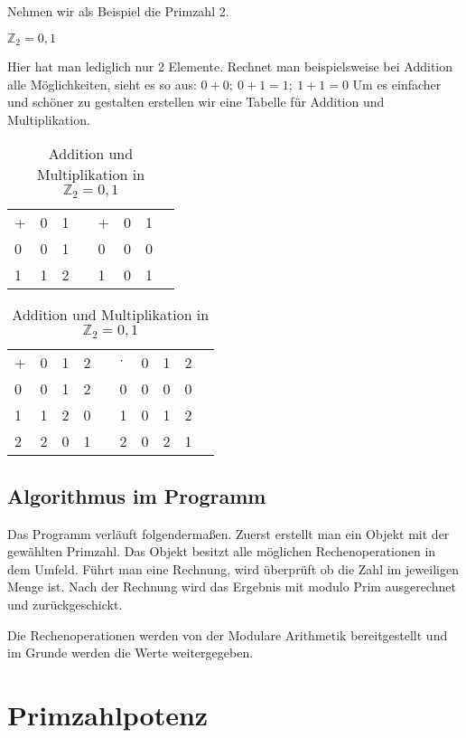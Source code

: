Nehmen wir als Beispiel die Primzahl 2.

$ \mathbb{Z}_2 = {0,1} $

Hier hat man lediglich nur 2 Elemente. Rechnet man beispielsweise bei Addition alle Möglichkeiten, sieht es so aus: $0 + 0;\ 0 + 1 = 1;\ 1 + 1 = 0$ 
Um es einfacher und schöner zu gestalten erstellen wir eine Tabelle für Addition und Multiplikation.


\begin{table}[h]\caption{Addition und Multiplikation in $ \mathbb{Z}_2 = {0,1} $}
    \begin{tabular}{l|l|lll|l|ll}
    + & 0 & 1 &  & + & 0 & 1 &  \\ \cline{1-3} \cline{5-7}
    0 & 0 & 1 &  & 0 & 0 & 0 &  \\ \cline{1-3} \cline{5-7}
    1 & 1 & 2 &  & 1 & 0 & 1 & 
    \end{tabular}
\end{table}
\begin{table}[h]\caption{Addition und Multiplikation in $ \mathbb{Z}_2 = {0,1} $}
    \begin{tabular}{l|l|l|lll|l|l|ll}
    + & 0 & 1 & 2 &  & $\cdot$ & 0 & 1 & 2 &  \\ \cline{1-4} \cline{6-9}
    0 & 0 & 1 & 2 &  & 0 & 0 & 0 & 0 &  \\ \cline{1-4} \cline{6-9}
    1 & 1 & 2 & 0 &  & 1 & 0 & 1 & 2 &  \\ \cline{1-4} \cline{6-9}
    2 & 2 & 0 & 1 &  & 2 & 0 & 2 & 1 & 
    \end{tabular}
\end{table}

\subsection*{Algorithmus im Programm}

Das Programm verläuft folgendermaßen. Zuerst erstellt man ein Objekt mit der gewählten Primzahl. Das Objekt besitzt alle möglichen Rechenoperationen in dem Umfeld.
Führt man eine Rechnung, wird überprüft ob die Zahl im jeweiligen Menge ist. Nach der Rechnung wird das Ergebnis mit modulo Prim ausgerechnet und zurückgeschickt. 

Die Rechenoperationen werden von der Modulare Arithmetik bereitgestellt und im Grunde werden die Werte weitergegeben.

\newpage
\section{Primzahlpotenz}

